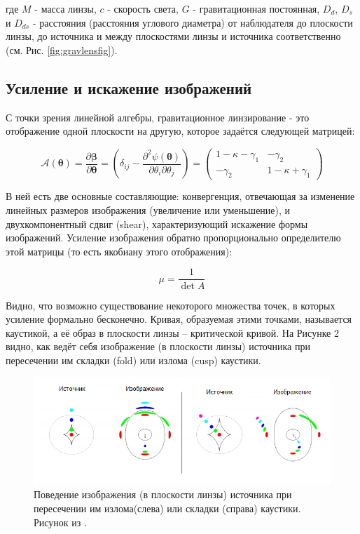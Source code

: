 где $M$ - масса линзы, $c$ - скорость света, $G$ - гравитационная постоянная, $D_d$, $D_s$ и $D_{ds}$ - расстояния (расстояния углового диаметра) от наблюдателя до плоскости линзы, до источника и между плоскостями линзы и источника соответственно (см. Рис. \ref{fig:gravlensfig}).

\subsection{Усиление и искажение изображений}

С точки зрения линейной алгебры, гравитационное линзирование - это отображение одной плоскости на другую, которое задаётся следующей матрицей:

\begin{equation}
\mathcal{A}(\boldsymbol{\theta})=\frac{\partial \boldsymbol{\beta}}{\partial \boldsymbol{\theta}}=\left(\delta_{i j}-\frac{\partial^{2} \psi(\boldsymbol{\theta})}{\partial \theta_{i} \partial \theta_{j}}\right)=\left(\begin{array}{cc}{1-\kappa-\gamma_{1}} & {-\gamma_{2}} \\ {-\gamma_{2}} & {1-\kappa+\gamma_{1}}\end{array}\right)
\end{equation}

В ней есть две основные составляющие: конвергенция, отвечающая за изменение линейных размеров изображения (увеличение или уменьшение), и двухкомпонентный сдвиг (shear), характеризующий искажение формы изображений. Усиление изображения обратно пропорционально определителю этой матрицы (то есть якобиану этого отображения):

\begin{equation}
\mu=\frac{1}{\operatorname{det} A}
\end{equation}

Видно, что возможно существование некоторого множества точек, в которых усиление формально бесконечно. Кривая, образуемая этими точками, называется каустикой, а её образ в плоскости линзы – критической кривой. На Рисунке 2 видно, как ведёт себя изображение (в плоскости линзы) источника при пересечении им складки (fold) или излома (cusp) каустики.
 
\begin{figure}[h!]
    \centering
	\includegraphics[scale=0.8]{pics/caust_intro.png}
	\caption{Поведение изображения (в плоскости линзы) источника при пересечении им излома(слева) или складки (справа) каустики. Рисунок из \cite{narbart}.}
\end{figure}

